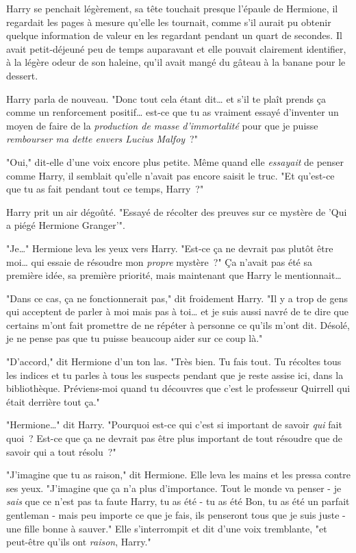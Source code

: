 Harry se penchait légèrement, sa tête touchait presque l'épaule de Hermione, il regardait les pages à mesure qu'elle les tournait, comme s'il aurait pu obtenir quelque information de valeur en les regardant pendant un quart de secondes. Il avait petit-déjeuné peu de temps auparavant et elle pouvait clairement identifier, à la légère odeur de son haleine, qu'il avait mangé du gâteau à la banane pour le dessert.

Harry parla de nouveau. "Donc tout cela étant dit… et s'il te plaît prends ça comme un renforcement positif… est-ce que tu as vraiment essayé d'inventer un moyen de faire de la \emph{production de masse d'immortalité} pour que je puisse \emph{rembourser ma dette envers Lucius Malfoy}~?"

"Oui," dit-elle d'une voix encore plus petite. Même quand elle \emph{essayait} de penser comme Harry, il semblait qu'elle n'avait pas encore saisit le truc. "Et qu'est-ce que tu as fait pendant tout ce temps, Harry~?"

Harry prit un air dégoûté. "Essayé de récolter des preuves sur ce mystère de 'Qui a piégé Hermione Granger'".

"Je…" Hermione leva les yeux vers Harry. "Est-ce ça ne devrait pas plutôt être moi… qui essaie de résoudre mon \emph{propre} mystère~?" Ça n'avait pas été sa première idée, sa première priorité, mais maintenant que Harry le mentionnait…

"Dans ce cas, ça ne fonctionnerait pas," dit froidement Harry. "Il y a trop de gens qui acceptent de parler à moi mais pas à toi… et je suis aussi navré de te dire que certains m'ont fait promettre de ne répéter à personne ce qu'ils m'ont dit. Désolé, je ne pense pas que tu puisse beaucoup aider sur ce coup là."

"D'accord," dit Hermione d'un ton las. "Très bien. Tu fais tout. Tu récoltes tous les indices et tu parles à tous les suspects pendant que je reste assise ici, dans la bibliothèque. Préviens-moi quand tu découvres que c'est le professeur Quirrell qui était derrière tout ça."

"Hermione…" dit Harry. "Pourquoi est-ce qui c'est si important de savoir \emph{qui} fait quoi~? Est-ce que ça ne devrait pas être plus important de tout résoudre que de savoir qui a tout résolu~?"

"J'imagine que tu as raison," dit Hermione. Elle leva les mains et les pressa contre ses yeux. "J'imagine que ça n'a plus d'importance. Tout le monde va penser - je \emph{sais} que ce n'est pas ta faute Harry, tu as été - tu as été Bon, tu as été un parfait gentleman - mais peu importe ce que je fais, ils penseront tous que je suis juste - une fille bonne à sauver." Elle s'interrompit et dit d'une voix tremblante, "et peut-être qu'ils ont \emph{raison}, Harry."

